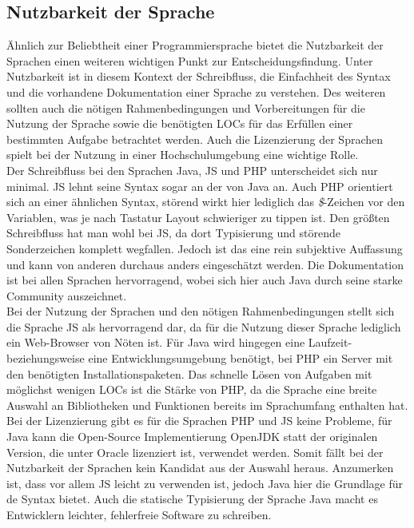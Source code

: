 \subsection*{Nutzbarkeit der Sprache} 

Ähnlich zur Beliebtheit einer Programmiersprache bietet die Nutzbarkeit der Sprachen einen weiteren wichtigen Punkt zur Entscheidungsfindung. Unter Nutzbarkeit ist in diesem Kontext der Schreibfluss, die Einfachheit des Syntax und die vorhandene Dokumentation einer Sprache zu verstehen. Des weiteren sollten auch die nötigen Rahmenbedingungen und Vorbereitungen für die Nutzung der Sprache sowie die benötigten \acp{LOC} für das Erfüllen einer bestimmten Aufgabe betrachtet werden. Auch die Lizenzierung der Sprachen spielt bei der Nutzung in einer Hochschulumgebung eine wichtige Rolle.\\
\linebreak
Der Schreibfluss bei den Sprachen Java, \ac{JS} und \ac{PHP} unterscheidet sich nur minimal. \ac{JS} lehnt seine Syntax sogar an der von Java an. Auch \ac{PHP} orientiert sich an einer ähnlichen Syntax, störend wirkt hier lediglich das \textit{\$}-Zeichen vor den Variablen, was je nach Tastatur Layout schwieriger zu tippen ist. Den größten Schreibfluss hat man wohl bei \ac{JS}, da dort Typisierung und störende Sonderzeichen komplett wegfallen. Jedoch ist das eine rein subjektive Auffassung und kann von anderen durchaus anders eingeschätzt werden. Die Dokumentation ist bei allen Sprachen hervorragend, wobei sich hier auch Java durch seine starke Community auszeichnet.\\
\linebreak
Bei der Nutzung der Sprachen und den nötigen Rahmenbedingungen stellt sich die Sprache \ac{JS} als hervorragend dar, da für die Nutzung dieser Sprache lediglich ein Web-Browser von Nöten ist. Für Java wird hingegen eine Laufzeit- beziehungsweise eine Entwicklungsumgebung benötigt, bei \ac{PHP} ein Server mit den benötigten Installationspaketen. Das schnelle Lösen von Aufgaben mit möglichst wenigen \acp{LOC} ist die Stärke von \ac{PHP}, da die Sprache eine breite Auswahl an Bibliotheken und Funktionen bereits im Sprachumfang enthalten hat.\\
\linebreak
Bei der Lizenzierung gibt es für die Sprachen \ac{PHP} und \ac{JS} keine Probleme, für Java kann die Open-Source Implementierung OpenJDK statt der originalen Version, die unter Oracle lizenziert ist, verwendet werden. Somit fällt bei der Nutzbarkeit der Sprachen kein Kandidat aus der Auswahl heraus. Anzumerken ist, dass vor allem \ac{JS} leicht zu verwenden ist, jedoch Java hier die Grundlage für de Syntax bietet. Auch die statische Typisierung der Sprache Java macht es Entwicklern leichter, fehlerfreie Software zu schreiben.

